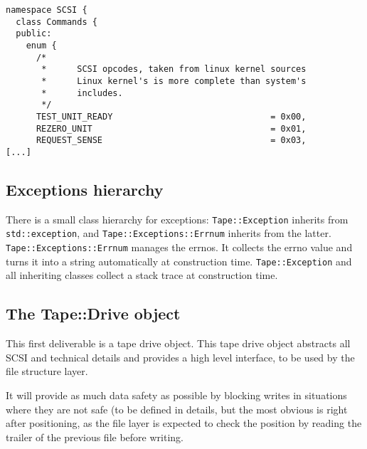\begin{table}
\begin{lstlisting}[caption=SCSI::Constants,label=SCSI_consts]
namespace SCSI {
  class Commands {
  public:
    enum {
      /*
       *      SCSI opcodes, taken from linux kernel sources
       *      Linux kernel's is more complete than system's
       *      includes.
       */
      TEST_UNIT_READY                               = 0x00,
      REZERO_UNIT                                   = 0x01,
      REQUEST_SENSE                                 = 0x03,
[...]
\end{lstlisting}
\end{table}

\subsection{Exceptions hierarchy}

There is a small class hierarchy for exceptions: \verb#Tape::Exception# inherits from
\verb#std::exception#, and \verb#Tape::Exceptions::Errnum# inherits from the latter.
\verb#Tape::Exceptions::Errnum# manages the errnos. It collects the errno value and turns it
into a string automatically at construction time.  \verb#Tape::Exception# and all inheriting
classes collect a stack trace at construction time.

\subsection{The Tape::Drive object}

This first deliverable is a tape drive object. This tape drive object abstracts all
SCSI and technical details and provides a high level interface, to be used by the 
file structure layer.

It will provide as much data safety as possible by blocking writes in situations
where they are not safe (to be defined in details, but the most obvious is right
after positioning, as the file layer is expected to check the position by reading
the trailer of the previous file before writing.

